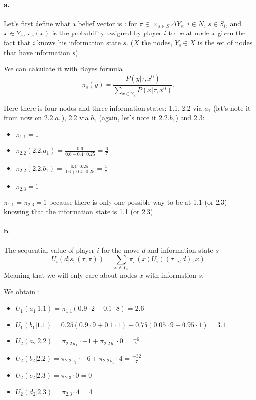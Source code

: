 \paragraph{a.} Let's first define what a belief vector is : for $\pi \in  \times_{s \in S} \Delta Y_s $, $i \in N$, $s \in S_i$, and $x \in Y_s$, $\pi_s(x)$ is the probability assigned by player $i$ to be at node $x$ given the fact that $i$ knows his information state $s$. ($X$ the nodes, $Y_s\in X$ is the set of nodes that have information $s$). 

We can calculate it with Bayes formula $$ \pi_s(y) = \frac{P(y | \tau, x^0)}{\sum_{x \in Y_s} P(x | \tau, x^0)}. $$

Here there is four nodes and three information states: 1.1, 2.2 via $a_1$ (let's note it from now on $2.2.a_1$), 2.2 via $b_1$ (again, let's note it $2.2.b_1$) and 2.3: 

\begin{itemize}
\item $\pi_{1.1}= 1$ 
\item $\pi_{2.2}(2.2.a_1) = \frac{0.6}{0.6+0.4 \cdot 0.25} = \frac{6}{7}$
\item $\pi_{2.2}(2.2.b_1)= \frac{0.4\cdot 0.25}{0.6+0.4 \cdot 0.25} = \frac{1}{7}$ 
\item $\pi_{2.3}     = 1 $
\end{itemize}
$\pi_{1.1}=\pi_{2.3} = 1$ because there is only one possible way to be at 1.1 (or 2.3) knowing that the information state is 1.1 (or 2.3).

\paragraph{b.} The sequential value of player $i$ for the move $d$ and information state $s$ $$ U_i(d| s, (\tau, \pi) ) = \sum_{x \in Y_s} \pi_s(x) U_i((\tau_{-i}, d), x)$$
Meaning that we will only care about nodes $x$ with information $s$. 

We obtain : 
\begin{itemize}
\item $U_1(a_1|1.1) = \pi_{1.1} (0.9 \cdot 2 + 0.1 \cdot 8) = 2.6$
\item $U_1(b_1|1.1) = 0.25 (0.9 \cdot 9 + 0.1 \cdot 1) + 0.75 (0.05 \cdot 9 + 0.95 \cdot 1) = 3.1$
\item $U_2(a_2|2.2) = \pi_{2.2.a_1} \cdot -1 + \pi_{2.2.b_1} \cdot 0 = \frac{-6}{7}$
\item $U_2(b_2|2.2) = \pi_{2.2.a_1} \cdot -6 + \pi_{2.2.b_1} \cdot 4 = \frac{-32}{7}$
\item $U_2(c_2|2.3) = \pi_{2.3} \cdot 0 = 0 $
\item $U_2(d_2|2.3) = \pi_{2.3} \cdot 4 = 4$
\end{itemize}

